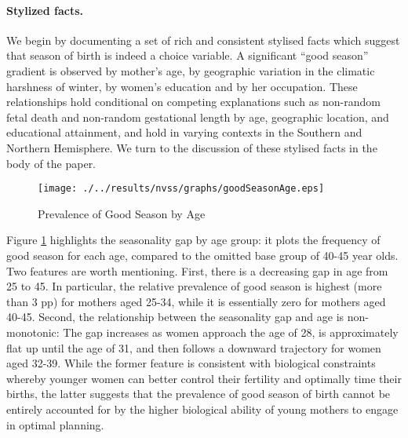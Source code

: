 \documentclass[a4paper, 11.5 pt]{article}
\theoremstyle{plain}
\begin{document}
\begin{doublespace}
\paragraph{Stylized facts.} We begin by documenting a set of rich and consistent stylised facts which suggest that season of birth is indeed a choice variable.  A significant ``good season'' gradient is observed by mother's age, by geographic variation in the climatic harshness of winter, by women's education and by her occupation.  These relationships hold conditional on competing explanations such as non-random fetal death and non-random gestational length by age, geographic location, and educational attainment, and hold in varying contexts in the Southern and Northern Hemisphere.  We turn to the discussion of these stylised facts in the body of the paper.


\begin{figure}[htpb!]
\begin{center}
  \centering
  \caption{Prevalence of Good Season by Age}
  \texttt{[image: ./../results/nvss/graphs/goodSeasonAge.eps]}
  \label{fig:goodByAge}
\end{center}
\vspace{-5mm}
\end{figure}

Figure \ref{fig:goodByAge} highlights the seasonality gap by age group: it plots the frequency of good season for each age, compared to the omitted base group of 40-45 year olds.  Two features are worth mentioning. First, there is a decreasing gap in age from 25 to 45. In particular, the relative prevalence of good season is highest (more than 3 pp) for mothers aged 25-34, while it is essentially zero for mothers aged 40-45. Second, the relationship between the seasonality gap and age is non-monotonic: The gap increases as women approach the age of 28, is approximately flat up until the age of 31, and then follows a downward trajectory for women aged 32-39. While the former feature is consistent with biological constraints whereby younger women can better control their fertility and optimally time their births, the latter suggests that the prevalence of good season of birth cannot be entirely accounted for by the higher biological ability of young mothers to engage in optimal planning.



\end{doublespace}
\end{document}
